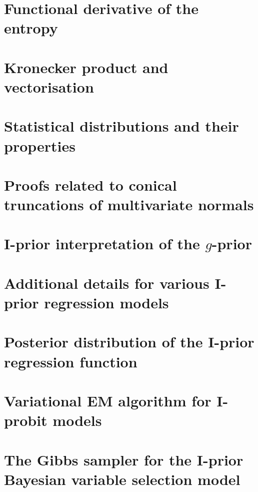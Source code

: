 \documentclass[11pt,twoside,openright]{report}
\begin{document}

\appendix

\chapter{Functional derivative of the entropy}\label{apx:funcder}
\thispagestyle{chapterapx}


\chapter{Kronecker product and vectorisation}
\thispagestyle{chapterapx}


\chapter{Statistical distributions and their properties}
\thispagestyle{chapterapx}


\chapter{Proofs related to conical truncations of multivariate normals}\label{apx:contrunproof}
\thispagestyle{chapterapx}


\chapter{I-prior interpretation of the $g$-prior}\label{misc:gprior}
\thispagestyle{chapterapx}


\chapter{Additional details for various I-prior regression models}
\thispagestyle{chapterapx}


\chapter{Posterior distribution of the I-prior regression function}
\thispagestyle{chapterapx}


\chapter{Variational EM algorithm for I-probit models}\label{apx:varemiprobit}
\thispagestyle{chapterapx}


\chapter{The Gibbs sampler for the I-prior Bayesian variable selection model}\label{apx:gibbsbvs}
\thispagestyle{chapterapx}

 
\hClosingStuffStandalone
\end{document}
